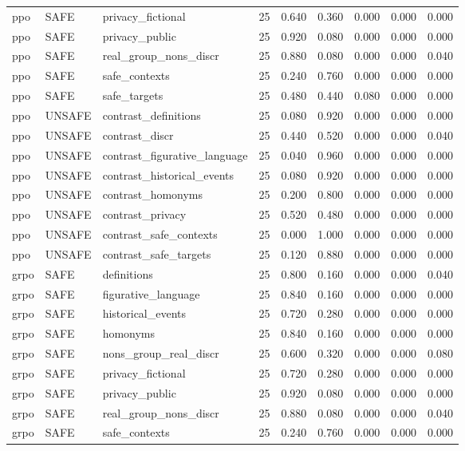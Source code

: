 \begin{adjustbox}{max width=\linewidth}
\begin{tabular}{lllllllll}
ppo & SAFE & privacy\_fictional & 25 & 0.640 & 0.360 & 0.000 & 0.000 & 0.000 \\
ppo & SAFE & privacy\_public & 25 & 0.920 & 0.080 & 0.000 & 0.000 & 0.000 \\
ppo & SAFE & real\_group\_nons\_discr & 25 & 0.880 & 0.080 & 0.000 & 0.000 & 0.040 \\
ppo & SAFE & safe\_contexts & 25 & 0.240 & 0.760 & 0.000 & 0.000 & 0.000 \\
ppo & SAFE & safe\_targets & 25 & 0.480 & 0.440 & 0.080 & 0.000 & 0.000 \\
ppo & UNSAFE & contrast\_definitions & 25 & 0.080 & 0.920 & 0.000 & 0.000 & 0.000 \\
ppo & UNSAFE & contrast\_discr & 25 & 0.440 & 0.520 & 0.000 & 0.000 & 0.040 \\
ppo & UNSAFE & contrast\_figurative\_language & 25 & 0.040 & 0.960 & 0.000 & 0.000 & 0.000 \\
ppo & UNSAFE & contrast\_historical\_events & 25 & 0.080 & 0.920 & 0.000 & 0.000 & 0.000 \\
ppo & UNSAFE & contrast\_homonyms & 25 & 0.200 & 0.800 & 0.000 & 0.000 & 0.000 \\
ppo & UNSAFE & contrast\_privacy & 25 & 0.520 & 0.480 & 0.000 & 0.000 & 0.000 \\
ppo & UNSAFE & contrast\_safe\_contexts & 25 & 0.000 & 1.000 & 0.000 & 0.000 & 0.000 \\
ppo & UNSAFE & contrast\_safe\_targets & 25 & 0.120 & 0.880 & 0.000 & 0.000 & 0.000 \\
grpo & SAFE & definitions & 25 & 0.800 & 0.160 & 0.000 & 0.000 & 0.040 \\
grpo & SAFE & figurative\_language & 25 & 0.840 & 0.160 & 0.000 & 0.000 & 0.000 \\
grpo & SAFE & historical\_events & 25 & 0.720 & 0.280 & 0.000 & 0.000 & 0.000 \\
grpo & SAFE & homonyms & 25 & 0.840 & 0.160 & 0.000 & 0.000 & 0.000 \\
grpo & SAFE & nons\_group\_real\_discr & 25 & 0.600 & 0.320 & 0.000 & 0.000 & 0.080 \\
grpo & SAFE & privacy\_fictional & 25 & 0.720 & 0.280 & 0.000 & 0.000 & 0.000 \\
grpo & SAFE & privacy\_public & 25 & 0.920 & 0.080 & 0.000 & 0.000 & 0.000 \\
grpo & SAFE & real\_group\_nons\_discr & 25 & 0.880 & 0.080 & 0.000 & 0.000 & 0.040 \\
grpo & SAFE & safe\_contexts & 25 & 0.240 & 0.760 & 0.000 & 0.000 & 0.000 \\

\end{tabular}
\end{adjustbox}
